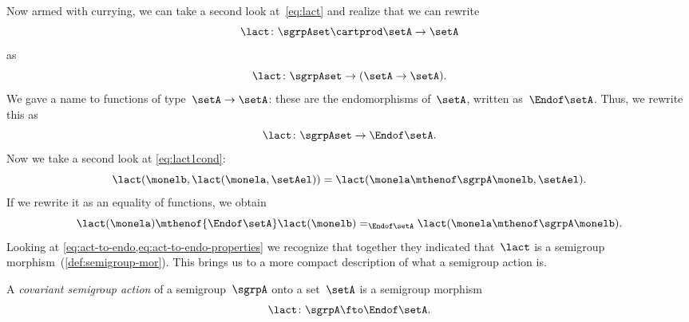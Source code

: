 
Now armed with currying, we can take a second look at~\cref{eq:lact} and realize that we can rewrite
\begin{equation}
    \label{eq:currying-lact-1}
    \lact \colon \sgrpAset \cartprod \setA \to \setA
\end{equation}
as
\begin{equation}
    \label{eq:currying-lact-2}
    \lact \colon \sgrpAset \to (\setA \to \setA).
\end{equation}
%
We gave a name to functions of type~$\setA \to \setA$: these are the endomorphisms of~$\setA$, written as~$\Endof\setA$.
Thus, we rewrite this as
%
\begin{equation}
    \label{eq:act-to-endo}
    \lact \colon \sgrpAset \to \Endof\setA.
\end{equation}
%
Now we take a second look at \cref{eq:lact1cond}:
%
\begin{equation}
    \label{eq:lact1cond-2}
    \lact(\monelb, \lact(\monela, \setAel)) = \lact(\monela \mthenof\sgrpA \monelb, \setAel).
\end{equation}
%
If we rewrite it as an equality of functions, we obtain
%
\begin{equation}
    \label{eq:act-to-endo-properties}
    \lact(\monela) \mthenof{\Endof\setA}  \lact(\monelb) =_{\Endof\setA} \lact(\monela \mthenof\sgrpA \monelb).
\end{equation}
%
Looking at \cref{eq:act-to-endo,eq:act-to-endo-properties} we recognize that together they indicated that~$\lact$ is a semigroup morphism~(\cref{def:semigroup-mor}).
This brings us to a more compact description of what a semigroup action is.

\begin{ctdefinition}
    \label{def:semigroup-cov-action}
    A \emph{covariant semigroup action} of a semigroup~$\sgrpA$ onto a set~$\setA$ is a semigroup morphism
    \begin{equation}
        \label{eq:act-semigroup}
        \lact \colon \sgrpA \fto \Endof\setA.
    \end{equation}
\end{ctdefinition}

